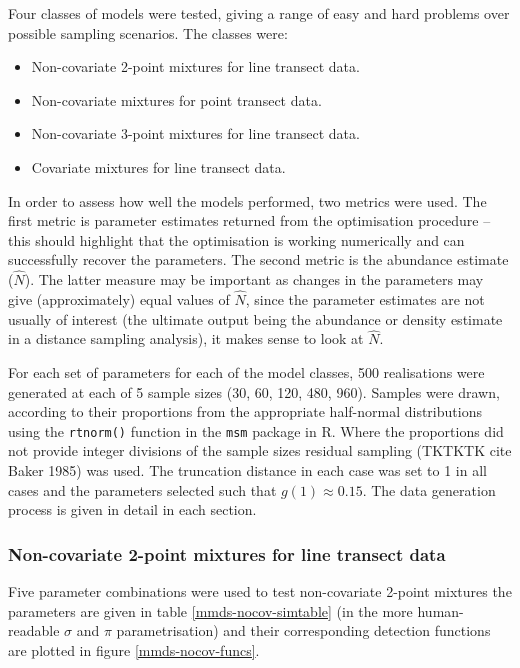 Four classes of models were tested, giving a range of easy and hard problems over possible sampling scenarios. The classes were:
\begin{itemize}
	\item Non-covariate 2-point mixtures for line transect data.
	\item Non-covariate mixtures for point transect data.
	\item Non-covariate 3-point mixtures for line transect data.
	\item Covariate mixtures for line transect data.
\end{itemize}
In order to assess how well the models performed, two metrics were used. The first metric is parameter estimates returned from the optimisation procedure -- this should highlight that the optimisation is working numerically and can successfully recover the parameters. The second metric is the abundance estimate ($\hat{N}$). The latter measure may be important as changes in the parameters may give (approximately) equal values of $\hat{N}$, since the parameter estimates are not usually of interest (the ultimate output being the abundance or density estimate in a distance sampling analysis), it makes sense to look at $\hat{N}$.

For each set of parameters for each of the model classes, 500 realisations were generated at each of 5 sample sizes (30, 60, 120, 480, 960). Samples were drawn, according to their proportions from the appropriate half-normal distributions using the \texttt{rtnorm()} function in the \texttt{msm} package in \textsf{R}. Where the proportions did not provide integer divisions of the sample sizes residual sampling (TKTKTK cite Baker 1985) was used. The truncation distance in each case was set to 1 in all cases and the parameters selected such that $g(1)\approx 0.15$. The data generation process is given in detail in each section.

\subsubsection{Non-covariate 2-point mixtures for line transect data}

Five parameter combinations were used to test non-covariate 2-point mixtures the parameters are given in table \ref{mmds-nocov-simtable} (in the more human-readable $\sigma$ and $\pi$ parametrisation) and their corresponding detection functions are plotted in figure \ref{mmds-nocov-funcs}.

